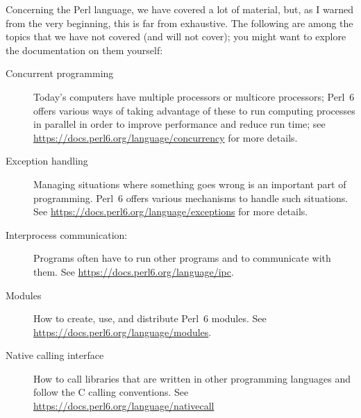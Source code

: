 Concerning the Perl language, we have covered a lot of 
material, but, as I warned from the very beginning, 
this is far from exhaustive. The following are among 
the topics that we have not covered (and will not cover); 
you might want to explore the documentation on them 
yourself:

\begin{description}
\item[Concurrent programming] Today's computers have 
multiple processors or multicore processors; Perl~6 
offers various ways of taking advantage of these to 
run computing processes in parallel in order to 
improve performance and reduce run time; see 
\url{https://docs.perl6.org/language/concurrency} 
for more details.

\item[Exception handling] Managing situations where 
something goes wrong is an important part of 
programming. Perl~6 offers various mechanisms to 
handle such situations. See \url{https://docs.perl6.org/language/exceptions} 
for more details.

\item[Interprocess communication:] Programs often have to 
run other programs and to communicate with them. See 
\url{https://docs.perl6.org/language/ipc}.

\item[Modules] How to create, use, and distribute Perl~6 
modules. See \url{https://docs.perl6.org/language/modules}.

\item[Native calling interface] How to call libraries 
that are written in other programming languages and 
follow the C calling conventions. 
See \url{https://docs.perl6.org/language/nativecall}

\end{description}